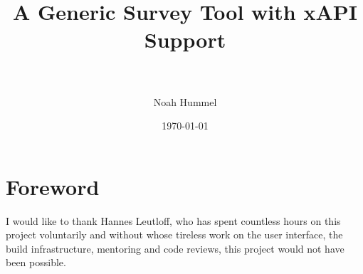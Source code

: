 \documentclass[a4paper,11pt]{article}
\title{A Generic Survey Tool with xAPI Support \\ \\ }
\date{\today}
\author{Noah Hummel}
\begin{document}
        \tableofcontents
        \pagebreak
    
        \section{Foreword}
            I would like to thank Hannes Leutloff, who has spent countless hours
            on this project voluntarily and without whose tireless work on
            the user interface, the build infrastructure, mentoring and code reviews, 
            this project would not have been possible.

        
        
        
        
        

        \pagebreak

        

        \pagebreak
        \listoffigures
        \listoftables
        
        
    
    
\end{document}
